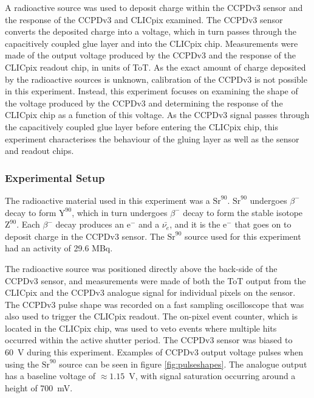 A radioactive source was used to deposit charge within the CCPDv3 sensor and the response of the CCPDv3 and CLICpix examined.  The CCPDv3 sensor converts the deposited charge into a voltage, which in turn passes through the capacitively coupled glue layer and into the CLICpix chip.  Measurements were made of the output voltage produced by the CCPDv3 and the response of the CLICpix readout chip, in units of ToT.  As the exact amount of charge deposited by the radioactive sources is unknown, calibration of the CCPDv3 is not possible in this experiment.  Instead, this experiment focuses on examining the shape of the voltage produced by the CCPDv3 and determining the response of the CLICpix chip as a function of this voltage.  As the CCPDv3 signal passes through the capacitively coupled glue layer before entering the CLICpix chip, this experiment characterises the behaviour of the gluing layer as well as the sensor and readout chips.


\subsubsection{Experimental Setup}
The radioactive material used in this experiment was a $\text{Sr}^{90}$.  $\text{Sr}^{90}$ undergoes $\beta^{-}$ decay to form $\text{Y}^{90}$, which in turn undergoes $\beta^{-}$ decay to form the stable isotope $\text{Z}^{90}$.  Each $\beta^{-}$ decay produces an $\text{e}^{-}$ and a $\bar{\nu_{e}}$, and it is the $\text{e}^{-}$ that goes on to deposit charge in the CCPDv3 sensor.  The $\text{Sr}^{90}$ source used for this experiment had an activity of 29.6 MBq.  

The radioactive source was positioned directly above the back-side of the CCPDv3 sensor, and measurements were made of both the ToT output from the CLICpix and the CCPDv3 analogue signal for individual pixels on the sensor.  The CCPDv3 pulse shape was recorded on a fast sampling oscilloscope that was also used to trigger the CLICpix readout.  The on-pixel event counter, which is located in the CLICpix chip, was used to veto events where multiple hits occurred within the active shutter period.  The CCPDv3 sensor was biased to 60~V during this experiment.  Examples of CCPDv3 output voltage pulses when using the $\text{Sr}^{90}$ source can be seen in figure \ref{fig:pulseshapes}.  The analogue output has a baseline voltage of $\approx 1.15$~V, with signal saturation occurring around a height of 700~mV.  

